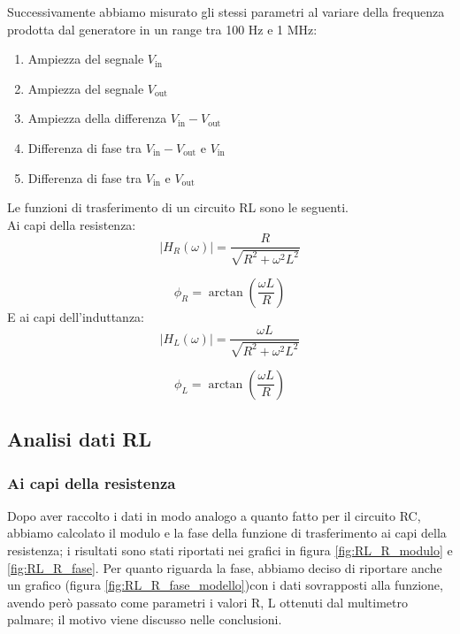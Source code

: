\documentclass[letterpaper,12pt]{article}
\begin{document}
Successivamente abbiamo misurato gli stessi parametri al variare della frequenza prodotta dal generatore in un range tra 100 Hz e 1 MHz:
\begin{enumerate}
	\item Ampiezza del segnale $V_\text{in}$
	\item Ampiezza del segnale $V_\text{out}$
	\item Ampiezza della differenza $V_\text{in} - V_\text{out}$
	\item Differenza di fase tra $V_\text{in} - V_\text{out}$ e $V_\text{in}$
	\item Differenza di fase tra $V_\text{in}$ e $V_\text{out}$
\end{enumerate}
Le funzioni di trasferimento di un circuito RL sono le seguenti. \\
Ai capi della resistenza:
\begin{equation}
	\label{eq:Modulo RL (resistenza)}
	|H_R(\omega)| = \frac{R}{\sqrt{R^2 + \omega^2L^2}}
\end{equation}

\begin{equation}
	\label{eq:Fase RL (resistenza)}
	\phi_R = \arctan\left(\frac{\omega L}{R}\right)
\end{equation}
E ai capi dell'induttanza:
\begin{equation}
	\label{eq:Modulo RL (induttanza)}
	|H_L(\omega)| = \frac{\omega L}{\sqrt{R^2 + \omega^2L^2}}
\end{equation}

\begin{equation}
	\label{eq:Fase RL (induttanza)}
	\phi_L = \arctan\left(\frac{\omega L}{R}\right)
\end{equation}


\subsection{Analisi dati RL}

\subsubsection{Ai capi della resistenza}

Dopo aver raccolto i dati in modo analogo a quanto fatto per il circuito RC, abbiamo calcolato il modulo e la fase della funzione di trasferimento ai capi della resistenza; i risultati sono stati riportati nei grafici in figura \ref{fig:RL_R_modulo} e \ref{fig:RL_R_fase}. Per quanto riguarda la fase, abbiamo deciso di riportare anche un grafico (figura \ref{fig:RL_R_fase_modello})con i dati sovrapposti alla funzione, avendo però passato come parametri i valori R, L ottenuti dal multimetro palmare; il motivo viene discusso nelle conclusioni.
\end{document}
